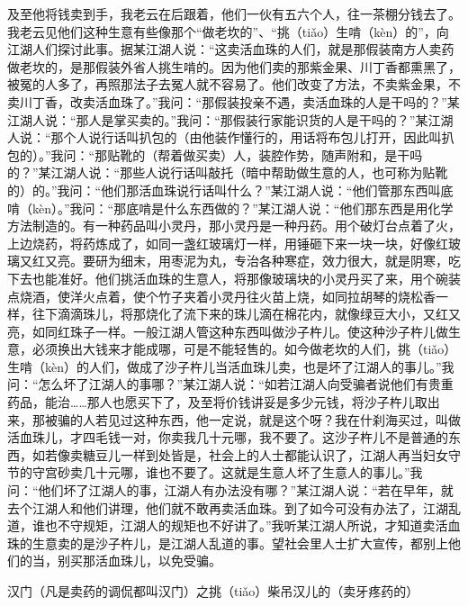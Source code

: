 \documentclass[12pt,UTF8]{ctexbook}
\begin{document}
及至他将钱卖到手，我老云在后跟着，他们一伙有五六个人，往一茶棚分钱去了。我老云见他们这种生意有些像那个“做老坎的”、“挑（tiǎo）生啃（kèn）的”，向江湖人们探讨此事。据某江湖人说：“这卖活血珠的人们，就是那假装南方人卖药做老坎的，是那假装外省人挑生啃的。因为他们卖的那紫金果、川丁香都熏黑了，被冤的人多了，再照那法子去冤人就不容易了。他们改变了方法，不卖紫金果，不卖川丁香，改卖活血珠了。”我问：“那假装投亲不遇，卖活血珠的人是干吗的？”某江湖人说：“那人是掌买卖的。”我问：“那假装行家能识货的人是干吗的？”某江湖人说：“那个人说行话叫扒包的（由他装作懂行的，用话将布包儿打开，因此叫扒包的）。”我问：“那贴靴的（帮着做买卖）人，装腔作势，随声附和，是干吗的？”某江湖人说：“那些人说行话叫敲托（暗中帮助做生意的人，也可称为贴靴的）的。”我问：“他们那活血珠说行话叫什么？”某江湖人说：“他们管那东西叫底啃（kèn）。”我问：“那底啃是什么东西做的？”某江湖人说：“他们那东西是用化学方法制造的。有一种药品叫小灵丹，那小灵丹是一种丹药。用个破灯台点着了火，上边烧药，将药炼成了，如同一盏红玻璃灯一样，用锤砸下来一块一块，好像红玻璃又红又亮。要研为细末，用枣泥为丸，专治各种寒症，效力很大，就是阴寒，吃下去也能准好。他们挑活血珠的生意人，将那像玻璃块的小灵丹买了来，用个碗装点烧酒，使洋火点着，使个竹子夹着小灵丹往火苗上烧，如同拉胡琴的烧松香一样，往下滴滴珠儿，将那烧化了流下来的珠儿滴在棉花内，就像绿豆大小，又红又亮，如同红珠子一样。一般江湖人管这种东西叫做沙子杵儿。使这种沙子杵儿做生意，必须换出大钱来才能成哪，可是不能轻售的。如今做老坎的人们，挑（tiǎo）生啃（kèn）的人们，做成了沙子杵儿当活血珠儿卖，也是坏了江湖人的事儿。”我问：“怎么坏了江湖人的事哪？”某江湖人说：“如若江湖人向受骗者说他们有贵重药品，能治……那人也愿买下了，及至将价钱讲妥是多少元钱，将沙子杵儿取出来，那被骗的人若见过这种东西，他一定说，就是这个呀？我在什刹海买过，叫做活血珠儿，才四毛钱一对，你卖我几十元哪，我不要了。这沙子杵儿不是普通的东西，如若像卖糖豆儿一样到处皆是，社会上的人士都能认识了，江湖人再当妇女守节的守宫砂卖几十元哪，谁也不要了。这就是生意人坏了生意人的事儿。”我问：“他们坏了江湖人的事，江湖人有办法没有哪？”某江湖人说：“若在早年，就去个江湖人和他们讲理，他们就不敢再卖活血珠。到了如今可没有办法了，江湖乱道，谁也不守规矩，江湖人的规矩也不好讲了。”我听某江湖人所说，才知道卖活血珠的生意卖的是沙子杵儿，是江湖人乱道的事。望社会里人士扩大宣传，都别上他们的当，别买那活血珠儿，以免受骗。





汉门（凡是卖药的调侃都叫汉门）之挑（tiǎo）柴吊汉儿的（卖牙疼药的）
\end{document}
